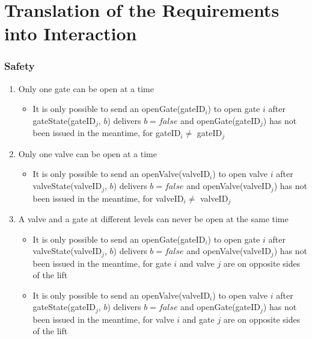 \section{Translation of the Requirements into Interaction}
\subsubsection*{Safety}
\begin{enumerate}
	\item Only one gate can be open at a time
		\begin{itemize}
			\item It is only possible to send an openGate(gateID$_i$) to open gate $i$ after gateState(gateID$_j$, $ b $) delivers $b = false$ and openGate(gateID$_j$) has not been issued in the meantime, for gateID$_i \neq$ gateID$_j$
		\end{itemize}
	
	\item Only one valve can be open at a time
		\begin{itemize}
			\item It is only possible to send an openValve(valveID$_i$) to open valve $i$ after valveState(valveID$_j$, $ b $) delivers $b = false$ and openValve(valveID$_j$) has not been issued in the meantime, for valveID$_i \neq$ valveID$_j$
		\end{itemize}
	
	\item A valve and a gate at different levels can never be open at the same time
		\begin{itemize}
			\item It is only possible to send an openGate(gateID$_i$) to open gate $i$ after valveState(valveID$_j$, $ b $) delivers $b = false$ and openValve(valveID$_j$) has not been issued in the meantime, for gate $i$ and valve $j$ are on opposite sides of the lift 
			\item It is only possible to send an openValve(valveID$_i$) to open valve $i$ after gateState(gateID$_j$, $ b $) delivers $b = false$ and openGate(gateID$_j$) has not been issued in the meantime, for valve $i$ and gate $j$ are on opposite sides of the lift
		\end{itemize}
	
	

\end{enumerate}
